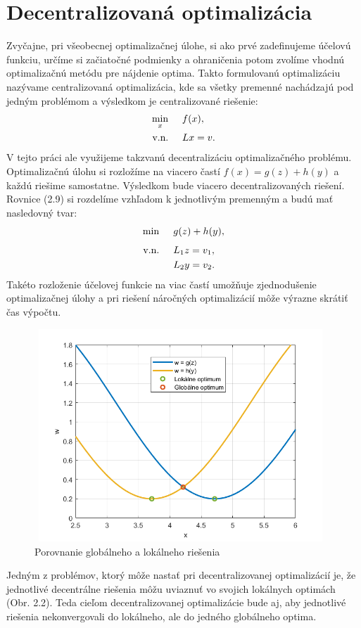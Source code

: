 \section{Decentralizovaná optimalizácia}
\label{se:DecentralizovanaOptimalizacia}
Zvyčajne, pri všeobecnej optimalizačnej úlohe, si ako prvé zadefinujeme účelovú funkciu, určíme si začiatočné podmienky a ohraničenia potom zvolíme vhodnú optimalizačnú metódu pre nájdenie optima. Takto formulovanú optimalizáciu nazývame centralizovaná optimalizácia, kde sa všetky premenné nachádzajú pod jedným problémom a výsledkom je centralizované riešenie:
\begin{subequations}
	\begin{align}
		\displaystyle \min_{x} \hspace{0.5cm} & 
		f(x),\\
		\textrm{v.n.} \hspace{0.5cm} & Lx = v.
	\end{align}
\end{subequations}
V tejto práci ale využijeme takzvanú decentralizáciu optimalizačného problému. Optimalizačnú úlohu si rozložíme na viacero častí $ f(x) = g(z) + h(y)$ a každú riešime samostatne. Výsledkom bude viacero decentralizovaných riešení. Rovnice (2.9) si rozdelíme vzhľadom k jednotlivým premenným a budú mať nasledovný tvar:
\begin{subequations}
	\begin{align}
		\displaystyle \min_{} \hspace{0.5cm} & 
		g(z) + h(y),\\
		\textrm{v.n.} \hspace{0.5cm} & L_{1}z = v_1,\\
		& L_{2}y = v_2.
	\end{align}
\end{subequations}
Takéto rozloženie účelovej funkcie na viac častí umožňuje zjednodušenie optimalizačnej úlohy a pri riešení náročných optimalizácií môže výrazne skrátiť čas výpočtu.
\begin{figure}[H]
	\centering
	\includegraphics[width=11cm,height=8cm]{images/Global_Local_ADM}
	\caption{Porovnanie globálneho a lokálneho riešenia}
\end{figure}
Jedným z problémov, ktorý môže nastať pri decentralizovanej optimalizácií je, že jednotlivé decentrálne riešenia môžu uviaznuť vo svojich lokálnych optimách (Obr. 2.2). Teda cieľom decentralizovanej optimalizácie bude aj, aby jednotlivé riešenia nekonvergovali do lokálneho, ale do jedného globálneho optima. 
